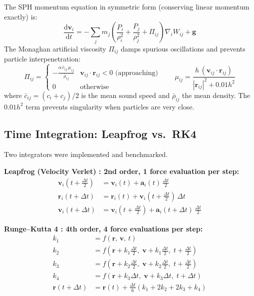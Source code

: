 \documentclass[11pt,a4paper]{article}
\begin{document}
The SPH momentum equation in symmetric form (conserving linear momentum exactly) is:
\[
  \frac{\mathrm{d}\mathbf{v}_i}{\mathrm{d}t}
  = -\sum_j m_j
    \left(\frac{P_i}{\rho_i^2} + \frac{P_j}{\rho_j^2} + \Pi_{ij}\right)
    \nabla_i W_{ij} + \mathbf{g}
\]
The Monaghan artificial viscosity $\Pi_{ij}$ damps spurious oscillations and prevents particle
interpenetration:
\[
  \Pi_{ij} =
  \begin{cases}
    \displaystyle -\frac{\alpha\,\bar{c}_{ij}\,\mu_{ij}}{\bar{\rho}_{ij}}
      & \mathbf{v}_{ij}\cdot\mathbf{r}_{ij} < 0 \text{ (approaching)} \\[6pt]
    0 & \text{otherwise}
  \end{cases}
  \qquad
  \mu_{ij} = \frac{h\,(\mathbf{v}_{ij}\cdot\mathbf{r}_{ij})}{|\mathbf{r}_{ij}|^2 + 0.01h^2}
\]
where $\bar{c}_{ij} = (c_i+c_j)/2$ is the mean sound speed and $\bar{\rho}_{ij}$ the mean
density.  The $0.01h^2$ term prevents singularity when particles are very close.

\subsection{Time Integration: Leapfrog vs.\ RK4}

Two integrators were implemented and benchmarked.

\textbf{Leapfrog (Velocity Verlet) : 2nd order, 1 force evaluation per step:}
\begin{align*}
  \mathbf{v}_i(t+\tfrac{\Delta t}{2}) &= \mathbf{v}_i(t) + \mathbf{a}_i(t)\,\tfrac{\Delta t}{2} \\
  \mathbf{r}_i(t+\Delta t)            &= \mathbf{r}_i(t) + \mathbf{v}_i(t+\tfrac{\Delta t}{2})\,\Delta t \\
  \mathbf{v}_i(t+\Delta t)            &= \mathbf{v}_i(t+\tfrac{\Delta t}{2}) + \mathbf{a}_i(t+\Delta t)\,\tfrac{\Delta t}{2}
\end{align*}

\textbf{Runge–Kutta 4 : 4th order, 4 force evaluations per step:}
\begin{align*}
  k_1 &= f(\mathbf{r},\,\mathbf{v},\,t) \\
  k_2 &= f\!\left(\mathbf{r}+k_1\tfrac{\Delta t}{2},\;\mathbf{v}+k_1\tfrac{\Delta t}{2},\;t+\tfrac{\Delta t}{2}\right) \\
  k_3 &= f\!\left(\mathbf{r}+k_2\tfrac{\Delta t}{2},\;\mathbf{v}+k_2\tfrac{\Delta t}{2},\;t+\tfrac{\Delta t}{2}\right) \\
  k_4 &= f\!\left(\mathbf{r}+k_3\Delta t,\;\mathbf{v}+k_3\Delta t,\;t+\Delta t\right) \\
  \mathbf{r}(t+\Delta t) &= \mathbf{r}(t) + \frac{\Delta t}{6}(k_1 + 2k_2 + 2k_3 + k_4)
\end{align*}
\end{document}
